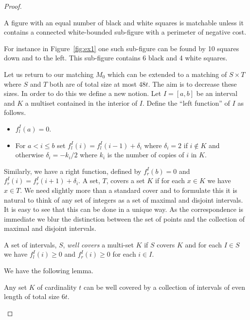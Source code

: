 \documentclass{theoretics}
\begin{document}
\begin{proof}
\begin{lemma}\label{lemma:nomatch}
A figure with an equal number of black and white squares
is matchable unless it contains
a connected white-bounded sub-figure with a perimeter
of negative cost.
\end{lemma}

For instance in Figure~\ref{fig:ex1} one such sub-figure
can be found by 10 squares down and to the left.
This sub-figure contains 6 black and 4 white
squares.

Let us return to our matching $M_0$
which can be extended to a matching of $S \times T$
where $S$ and $T$ both are of total size 
at most $48t$.  The aim is to decrease these sizes.
In order to do this we define a new notion.  Let
$I= [a,b]$ be an interval and $K$ a multiset contained
in the interior of $I$.  Define the ``left function'' of
$I$ as follows.

\begin{itemize}

\item $f^I_l(a)=0$.

\item For $a < i \leq b$ set $f^I_l (i) = f^I_l(i-1)+\delta_i$ where
$\delta_i = 2$ if $i \not \in K$ and otherwise $\delta_i = -k_i/2$ where
$k_i$ is the number of copies of $i$ in $K$.

\end{itemize}

Similarly, we have a right function, defined by $f^I_r(b)=0$ and
$f^I_r(i)=f^I_r(i+1)+\delta_i$.   A set, $T$,
covers a set $K$ if for each $x\in K$ we have $x\in T$.  
We need slightly more than a standard cover and to formulate
this it is natural to think of any set of integers as
a set of maximal and disjoint intervals.  It is easy to
see that this can be done in a unique way.  As the correspondence
is immediate we blur the distinction between the set of points
and the collection of maximal and disjoint intervals.

\begin{definition}
A set of intervals, $S$,
{\em well covers} a multi-set $K$
if $S$ covers $K$ and for each $I\in S$ 
we have $f_l^I (i) \geq 0$ and $f_r^I (i) \geq 0$ for
each $i \in I$.
\end{definition}

We have the following lemma. 
\begin{lemma} \label{lemma:wellcover}
Any set $K$ of cardinality $t$ can be well covered by
a collection of intervals of even length of total size
$6t$.
\end{lemma}


\end{proof}
\end{document}
